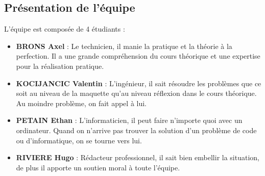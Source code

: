\documentclass[a4paper,11pt]{article}
\begin{document}
\subsection{Présentation de l’équipe}
L’équipe est composée de 4 étudiants :
\begin{itemize}
\item \textbf{BRONS Axel} : Le technicien, il manie la pratique et la théorie à la perfection. Il a une grande compréhension du cours théorique et une expertise pour la réalisation pratique.
\item \textbf{KOCIJANCIC Valentin} : L’ingénieur, il sait résoudre les problèmes que ce soit au niveau de la maquette qu’au niveau réflexion dans le cours théorique. Au moindre problème, on fait appel à lui. 
\item \textbf{PETAIN Ethan} : L'informaticien, il peut faire n’importe quoi avec un ordinateur. Quand on n’arrive pas trouver la solution d'un problème de code ou d'informatique, on se tourne vers lui. 
\item \textbf{RIVIERE Hugo} : Rédacteur professionnel, il sait bien embellir la situation, de plus il apporte un soutien moral à toute l'équipe.
\end{itemize}
\end{document}
